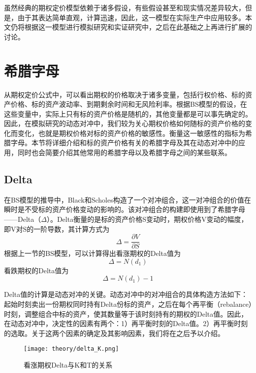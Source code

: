 虽然经典的期权定价模型依赖于诸多假设，有些假设甚至和现实情况差异较大，但是，由于其表达简单直观，计算迅速，因此，这一模型在实际生产中应用较多。本文仍将根据这一模型进行模拟研究和实证研究中，之后在此基础之上再进行扩展的讨论。

\section{希腊字母}

从期权定价公式中，可以看出期权的价格取决于诸多变量，包括行权价格、标的资产价格、标的资产波动率、到期剩余时间和无风险利率。根据BS模型的假设，在这些变量中，实际上只有标的资产价格是随机的，其他变量都是可以事先确定的。因此，在模拟研究的动态对冲中，我们较为关心期权价格如何随标的资产价格的变化而变化，也就是期权价格对标的资产价格的敏感性。衡量这一敏感性的指标为希腊字母。本节将详细介绍和标的资产价格有关的希腊字母及其在动态对冲中的应用，同时也会简要介绍其他常用的希腊字母以及希腊字母之间的某些联系。

\subsection{Delta}

在BS模型的推导中，Black和Scholes构造了一个对冲组合，这一对冲组合的价值在瞬时是不受标的资产价格变动的影响的。该对冲组合的构建即使用到了希腊字母——Delta（$\Delta$）。Delta衡量的是标的资产价格S变动时，期权价格V变动的幅度，即V对S的一阶导数，其计算方式为
\begin{equation}
  \Delta=\frac{\partial V}{\partial S}
\end{equation}
根据上一节的BS模型，可以计算得出看涨期权的Delta值为
\begin{equation}
  \Delta=N(d_1)
\end{equation}
看跌期权的Delta值为
\begin{equation}
  \Delta=N(d_1)-1
\end{equation}

Delta值的计算是动态对冲的关键。动态对冲中的对冲组合的具体构造方法如下：起始时刻卖出一份期权同时持有Delta份标的资产，之后在每个再平衡（rebalance）时刻，调整组合中标的资产，使其数量等于该时刻持有的期权的Delta值。因此，在动态对冲中，决定性的因素有两个：1）再平衡时刻的Delta值。2）再平衡时刻的选取。关于这两个因素的确定及其影响因素，我们将在之后予以介绍。

\begin{figure}[htb]
  \centering
  \texttt{[image: theory/delta\_K.png]}
  \caption[这里将出现在插图索引中]
    {看涨期权Delta与K和T的关系}
  \label{fig:delta_k}
\end{figure}

